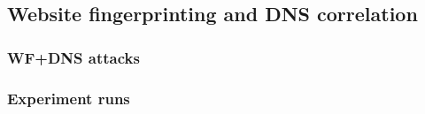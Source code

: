 \subsection{Website fingerprinting and DNS correlation}
\subsubsection{WF+DNS attacks}

\subsubsection{Experiment runs}

